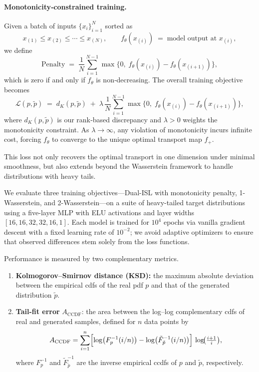 \documentclass{article}
\begin{document}
\paragraph{Monotonicity‐constrained training.}
Given a batch of inputs \(\{x_i\}_{i=1}^N\) sorted as
\[
x_{(1)} \le x_{(2)} \le \cdots \le x_{(N)},
\qquad
f_{\theta}(x_{(i)}) \;=\;\text{model output at }x_{(i)},
\]
we define
\[
\mathrm{Penalty}
\;=\;
\frac{1}{N}\sum_{i=1}^{N-1}
\max\bigl\{0,\;f_{\theta}(x_{(i)}) - f_{\theta}(x_{(i+1)})\bigr\},
\]
which is zero if and only if \(f_{\theta}\) is non‐decreasing.  The overall training objective becomes
\[
\mathcal{L}(p,\tilde p)
\;=\;
d_{K}(p,\tilde p)
\;+\;
\lambda\,
\frac{1}{N}\sum_{i=1}^{N-1}
\max\bigl\{0,\;f_{\theta}(x_{(i)}) - f_{\theta}(x_{(i+1)})\bigr\},
\]
where \(d_K(p,\tilde p)\) is our rank‐based discrepancy and \(\lambda>0\) weights the monotonicity constraint.  As \(\lambda\to\infty\), any violation of monotonicity incurs infinite cost, forcing \(f_{\theta}\) to converge to the unique optimal transport map \(f_{+}\).

This loss not only recovers the optimal transport in one dimension under minimal smoothness, but also extends beyond the Wasserstein framework to handle distributions with heavy tails. 

We evaluate three training objectives—Dual-ISL with monotonicity penalty, 1-Wasserstein, and 2-Wasserstein—on a suite of heavy-tailed target distributions using a five-layer MLP with ELU activations and layer widths \([16,16,32,32,16,1]\).  Each model is trained for \(10^4\) epochs via vanilla gradient descent with a fixed learning rate of \(10^{-2}\); we avoid adaptive optimizers to ensure that observed differences stem solely from the loss functions.

Performance is measured by two complementary metrics.
\begin{enumerate}
  \item \textbf{Kolmogorov--Smirnov distance (KSD):} the maximum absolute deviation between the empirical cdfs of the real pdf \(p\) and that of the generated distribution \(\tilde p\).
  \item \textbf{Tail-fit error} \(A_{\mathrm{CCDF}}\): the area between the log–log complementary cdfs of real and generated samples, defined for \(n\) data points by
  \[
    A_{\mathrm{CCDF}}
    = \sum_{i=1}^{n}
      \Bigl[
        \log\bigl(F_{p}^{-1}(i/n)\bigr)
        - \log\bigl(\tilde F_{\tilde p}^{-1}(i/n)\bigr)
      \Bigr]
      \,\log\!\bigl(\tfrac{i+1}{i}\bigr),
  \]
  where \(F_{p}^{-1}\) and \(\tilde F_{\tilde p}^{-1}\) are the inverse empirical ccdfs of \(p\) and \(\tilde p\), respectively.
\end{enumerate}
\end{document}
